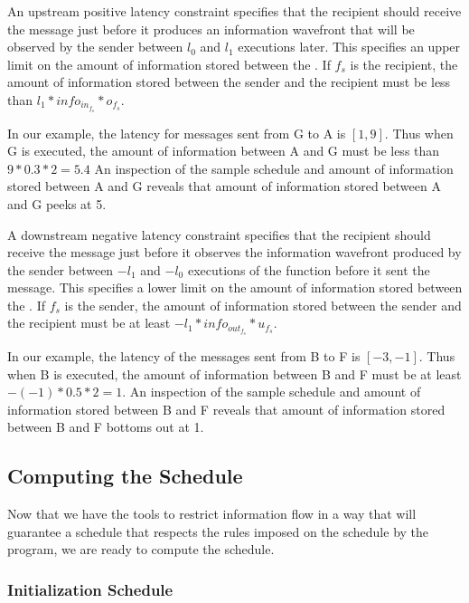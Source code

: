 
An upstream positive latency constraint specifies that the
recipient should receive the message just before it produces an
information wavefront that will be observed by the sender between
$l_0$ and $l_1$ executions later.  This specifies an upper limit
on the amount of information stored between the {\filters}.  If
$f_s$ is the recipient, the amount of information stored between
the sender and the recipient must be less than $l_1
* info_{in_{f_s}} * o_{f_s}$.

In our example, the latency for messages sent from {\filter} G to
{\filter} A is $[1,9]$.  Thus when {\filter} G is executed, the amount
of information between A and G must be less than $9 * 0.3 * 2 =
5.4$  An inspection of the sample schedule and amount of
information stored between A and G reveals that amount of
information stored between A and G peeks at 5.


A downstream negative latency constraint specifies that the
recipient should receive the message just before it observes the
information wavefront produced by the sender between $-l_1$ and
$-l_0$ executions of the {\work} function before it sent the
message.  This specifies a lower limit on the amount of
information stored between the {\filters}.  If $f_s$ is the sender,
the amount of information stored between the sender and the
recipient must be at least $-l_1 * info_{out_{f_s}} * u_{f_s}$.

In our example, the latency of the messages sent from {\filter} B to
{\filter} F is $[-3,-1]$.  Thus when {\filter} B is executed, the
amount of information between B and F must be at least $-(-1) *
0.5 * 2 = 1$.  An inspection of the sample schedule and amount of
information stored between B and F reveals that amount of
information stored between B and F bottoms out at 1.

\subsection{Computing the Schedule}
\label{sec:constrained:scheduling}

Now that we have the tools to restrict information flow in a way
that will guarantee a schedule that respects the rules imposed on
the schedule by the program, we are ready to compute the schedule.

\subsubsection{Initialization Schedule}

